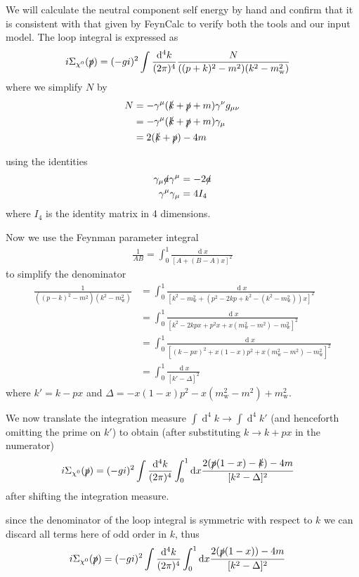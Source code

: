 \documentclass[11pt]{article}
\def\sp{\slashed{p}}
\def\sk{\slashed{k}}
\def\cn{\chi^0}
\def\gm{\gamma^{\mu}}
\def\gn{\gamma^{\nu}}
\renewcommand{\d}{\ensuremath{\operatorname{d}\!}}
\begin{document}
We will calculate the neutral component self energy by hand and confirm that it is consistent with that given by FeynCalc to verify both the tools and our input model.  The loop integral is expressed as
\begin{align}
i\Sigma_{\cn}(\slashed{p})&= (-gi)^2 \int \frac{\d^4k}{(2\pi)^4} \frac{N}{((p+k)^2-m^2)(k^2-m_{\text{w}}^2)}
\end{align}
where we simplify $N$ by
\begin{align*}
N&=-\gm(\sk+\sp+m)\gn g_{\mu\nu}\\
&=-\gm(\sk+\sp+m)\gamma_{\mu}\\
&=2(\sk+\sp)-4m
\end{align*}

using the identities
\begin{align}
\begin{split}
\gamma_{\mu}\slashed{a}\gm&=-2\slashed{a}\\
\gm\gamma_{\mu}&=4I_4
\end{split}
\end{align}
where $I_4$ is the identity matrix in 4 dimensions.

Now we use the Feynman parameter integral
\begin{align}
\frac{1}{AB}=\int_0^1 \frac{\d x}{[A+(B-A)x]^2}
\end{align}
to simplify the denominator
\begin{align*}
 \frac{1}{((p-k)^2-m^2)(k^2-m_{\text{w}}^2)}&=\int_0^1\frac{\d x}{[k^2-m_{\text{w}}^2+(p^2-2kp+k^2-(k^2-m_{\text{w}}^2))x]^2}\\
&=\int_0^1\frac{\d x}{[ k^2-2kpx+p^2x+x(m_{\text{w}}^2-m^2)-m_{\text{w}}^2]^2}\\
&=\int_0^1\frac{\d x}{[ (k-px)^2+x(1-x)p^2+x(m_{\text{w}}^2-m^2)-m_{\text{w}}^2]^2}\\
&=\int_0^1\frac{\d x}{[ k'-\Delta]^2}
\end{align*}
where $k'=k-px$ and $\Delta=-x(1-x)p^2-x(m_{\text{w}}^2-m^2)+m_{\text{w}}^2$.


We now translate the integration measure $\int \d^4k\rightarrow\int \d^4k'$ (and henceforth omitting the prime on $k'$) to obtain (after substituting $k\rightarrow k+px$ in the numerator)
\begin{align}
i\Sigma_{\cn}(\slashed{p})&= (-gi)^2 \int \frac{\d^4k}{(2\pi)^4}\int_0^1 \d x \frac{2(\sp(1-x)-\sk )-4m}{[ k^2-\Delta]^2}
\end{align}
after shifting the integration measure.

since the denominator of the loop integral is symmetric with respect to $k$ we can discard all terms here of odd order in $k$, thus
\begin{align}
i\Sigma_{\cn}(\slashed{p})&= (-gi)^2 \int \frac{\d^4k}{(2\pi)^4}\int_0^1 \d x \frac{2(\sp(1-x))-4m}{[ k^2-\Delta]^2}
\end{align}
\end{document}
